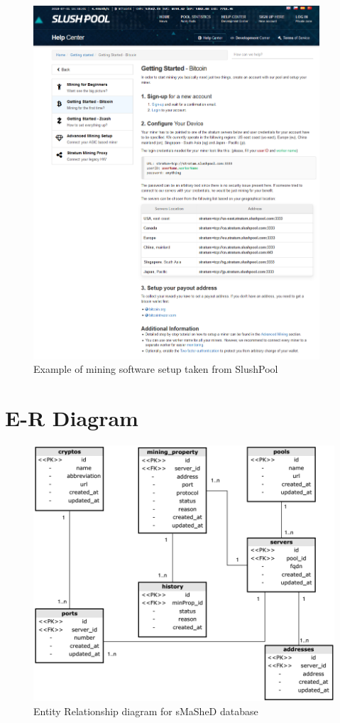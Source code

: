 \documentclass[preprint,12pt,3p]{elsarticle}
\begin{document}
\begin{figure}[!hb]
    \centering
    \includegraphics[width=0.95\textwidth]{slushpoolconfig.png}
    \caption{Example of mining software setup taken from SlushPool}
    \label{fig:slushpool}
\end{figure}

\section{E-R Diagram}
\label{appendix-sec2}

\begin{figure}[!hb]
    \centering
    \includegraphics[width=\textwidth]{erdiag.png}
    \caption{Entity Relationship diagram for sMaSheD database}
    \label{fig:erdiagram}
\end{figure}
\end{document}
